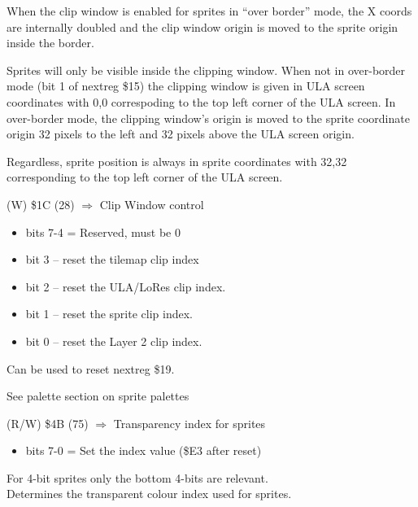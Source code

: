 When the clip window is enabled for sprites in “over border” mode, the
X coords are internally doubled and the clip window origin is moved to
the sprite origin inside the border.

Sprites will only be visible inside the clipping window. When not in
over-border mode (bit 1 of nextreg \$15) the clipping window is given
in ULA screen coordinates with 0,0 correspoding to the top left corner
of the ULA screen. In over-border mode, the clipping window’s origin
is moved to the sprite coordinate origin 32 pixels to the left and 32
pixels above the ULA screen origin.

Regardless, sprite position is always in sprite coordinates with 32,32
corresponding to the top left corner of the ULA screen.

(W) \$1C (28) $\Rightarrow$ Clip Window control
\begin{itemize}
\item[] bits 7-4 = Reserved, must be 0
\item[] bit 3 – reset the tilemap clip index
\item[] bit 2 – reset the ULA/LoRes clip index.
\item[] bit 1 – reset the sprite clip index.
\item[] bit 0 – reset the Layer 2 clip index.
\end{itemize}
Can be used to reset nextreg \$19.

See palette section on sprite palettes

(R/W) \$4B (75) $\Rightarrow$ Transparency index for sprites
\begin{itemize}
\item[] bits 7-0 = Set the index value (\$E3 after reset)
\end{itemize}
For 4-bit sprites only the bottom 4-bits are relevant.\\
Determines the transparent colour index used for sprites.
